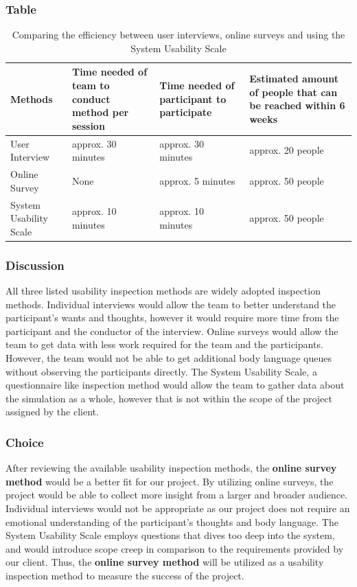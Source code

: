 \documentclass[10pt,journal,compsoc,draftclsnofoot]{IEEEtran}
\begin{document}
\subsubsection{Table}
\begin{center}
\begin{table}[H]
\begin{tabular}{ | m{10em} | m{15em} | m{15em} | m{15em} |  } 
\hline
\textbf{Methods}  & \textbf{Time needed of team to conduct method per session} & \textbf{Time needed of participant to participate} & \textbf{Estimated amount of people that can be reached within 6 weeks} \\ \hline
User Interview & approx. 30 minutes  & approx. 30 minutes & approx. 20 people \\ \hline
Online Survey & None & approx. 5 minutes & approx. 50 people \\ \hline
System Usability Scale & approx. 10 minutes & approx. 10 minutes  &  approx. 50 people \\ \hline 
\end{tabular}
\newline
\caption{Comparing the efficiency between user interviews, online surveys and using the System Usability Scale}
\label{table:inpectionmethods}
\end{table}
\end{center}

\subsubsection{Discussion}
All three listed usability inspection methods are widely adopted inspection methods.
Individual interviews would allow the team to better understand the participant's wants and thoughts, however it would require more time from the participant and the conductor of the interview.
Online surveys would allow the team to get data with less work required for the team and the participants.
However, the team would not be able to get additional body language queues without observing the participants directly.
The System Usability Scale, a questionnaire like inspection method would allow the team to gather data about the simulation as a whole, however that is not within the scope of the project assigned by the client.

\subsubsection{Choice}
After reviewing the available usability inspection methods, the \textbf{online survey method} would be a better fit for our project.
By utilizing online surveys, the project would be able to collect more insight from a larger and broader audience.
Individual interviews would not be appropriate as our project does not require an emotional understanding of the participant's thoughts and body language.
The System Usability Scale employs questions that dives too deep into the system, and would introduce scope creep in comparison to the requirements provided by our client.
Thus, the \textbf{online survey method} will be utilized as a usability inspection method to measure the success of the project.
\end{document}
